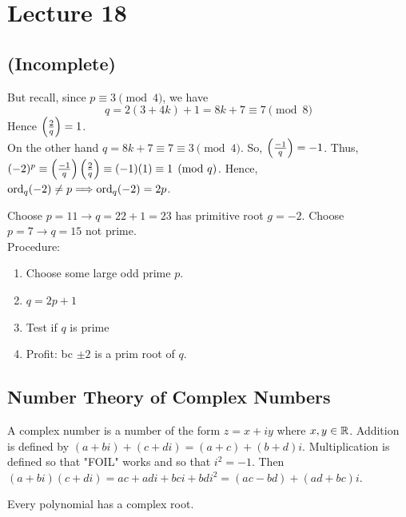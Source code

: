 \chapter{Lecture 18}
\date{October 29, 2024}

\section{(Incomplete)}
    But recall, since $p\equiv 3\pmod{4}$, we have
    \[
        q=2(3+4k)+1=8k+7\equiv 7\pmod{8}
    \]
    Hence $\left( \frac{2}{q} \right) =1$. \\
    On the other hand $q=8k+7\equiv 7\equiv 3\pmod{4}$.
    So, $\left( \frac{-1}{q} \right) =-1$. Thus, $(-2)^p\equiv\left( \frac{-1}{q} \right) \left( \frac{2}{q} \right) \equiv(-1)(1)\equiv 1\pmod{q}$.
    Hence, $\operatorname{ord}_q(-2)\ne p\Longrightarrow\operatorname{ord}_q(-2)=2p$.

    \begin{example}
        Choose $p=11\rightarrow q=22+1=23$ has primitive root $g=-2$.
        Choose $p=7\rightarrow q=15$ not prime. \\
        Procedure: 
        \begin{enumerate}
            \item Choose some large odd prime $p$. 
            \item $q=2p+1$
            \item Test if $q$ is prime
            \item Profit: bc $\pm 2$ is a prim root of $q$.
        \end{enumerate}
    \end{example}

\section{Number Theory of Complex Numbers}
    \begin{definition}
        A complex number is a number of the form $z=x+iy$ where 
        $x,y\in\mathbb{R}$. Addition is defined by $(a+bi)+(c+di) = (a+c)+(b+d)i$. 
        Multiplication is defined so that "FOIL" works and so that $i^2=-1$.
        Then $(a+bi)(c+di) = ac+adi+bci+bdi^2 = (ac-bd)+(ad+bc)i$.
    \end{definition}
    \begin{theorem} 
        Every polynomial has a complex root.
    \end{theorem}

